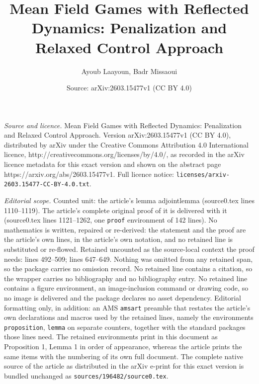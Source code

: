 \documentclass[10pt,a4paper]{amsart}
\title{Mean Field Games with Reflected Dynamics: Penalization and Relaxed Control Approach}
\author{Ayoub Laayoun, Badr Missaoui}
\date{Source: arXiv:2603.15477v1 (CC BY 4.0)}
\begin{document}
\maketitle

\noindent\emph{Source and licence.} Mean Field Games with Reflected Dynamics: Penalization and Relaxed Control Approach. Version arXiv:2603.15477v1 (CC BY 4.0), distributed by arXiv under the Creative Commons Attribution 4.0 International licence, http://creativecommons.org/licenses/by/4.0/, as recorded in the arXiv licence metadata for this exact version and shown on the abstract page https://arxiv.org/abs/2603.15477v1. Full licence notice: \texttt{licenses/arxiv-2603.15477-CC-BY-4.0.txt}.\par\smallskip

\noindent\textit{Editorial scope.} Counted unit: the article's lemma adjointlemma (source0.tex lines 1110--1119). The article's complete original proof of it is delivered with it (source0.tex lines 1121--1262, one \texttt{proof} environment of 142 lines). No mathematics is written, repaired or re-derived: the statement and the proof are the article's own lines, in the article's own notation, and no retained line is substituted or re-flowed.  Retained uncounted as the source-local context the proof needs: lines 492--509; lines 647--649.  Nothing was omitted from any retained span, so the package carries no omission record.  No retained line contains a citation, so the wrapper carries no bibliography and no bibliography entry.  No retained line contains a figure environment, an image-inclusion command or drawing code, so no image is delivered and the package declares no asset dependency.  Editorial formatting only, in addition: an AMS \texttt{amsart} preamble that restates the article's own declarations and macros used by the retained lines, namely the environments \texttt{proposition}, \texttt{lemma} on separate counters, together with the standard packages those lines need.  The retained environments print in this document as Proposition 1, Lemma 1 in order of appearance, whereas the article prints the same items with the numbering of its own full document.  The complete native source of the article as distributed in the arXiv e-print for this exact version is bundled unchanged as \texttt{sources/196482/source0.tex}.
\end{document}
